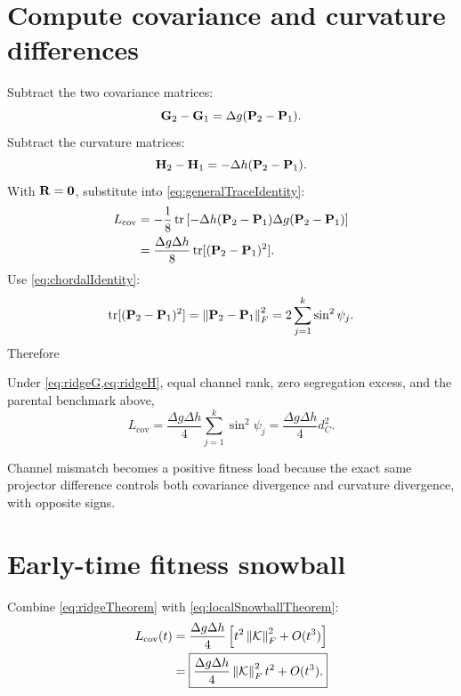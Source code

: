 \section{Compute covariance and curvature differences}

Subtract the two covariance matrices:
\begin{equation}
\mathbf{G}_2-\mathbf{G}_1=\Delta g(\mathbf{P}_2-\mathbf{P}_1).
\end{equation}
Subtract the curvature matrices:
\begin{equation}
\mathbf{H}_2-\mathbf{H}_1=-\Delta h(\mathbf{P}_2-\mathbf{P}_1).
\end{equation}
With \(\mathbf{R}=\mathbf{0}\), substitute into \cref{eq:generalTraceIdentity}:
\begin{align}
L_{\mathrm{cov}}
&=-\frac18\operatorname{tr}\left[
-\Delta h(\mathbf{P}_2-\mathbf{P}_1)
\Delta g(\mathbf{P}_2-\mathbf{P}_1)
\right]\\
&=\frac{\Delta g\Delta h}{8}
\operatorname{tr}[(\mathbf{P}_2-\mathbf{P}_1)^2].
\end{align}
Use \cref{eq:chordalIdentity}:
\begin{equation}
\operatorname{tr}[(\mathbf{P}_2-\mathbf{P}_1)^2]
=\left\lVert \mathbf{P}_2-\mathbf{P}_1\right\rVert_F^2
=2\sum_{j=1}^k\sin^2\psi_j.
\end{equation}
Therefore
\begin{theorem}
Under \cref{eq:ridgeG,eq:ridgeH}, equal channel rank, zero segregation excess, and the parental benchmark above,
\begin{equation}
\boxed{
L_{\mathrm{cov}}
=\frac{\Delta g\Delta h}{4}
\sum_{j=1}^k\sin^2\psi_j
=\frac{\Delta g\Delta h}{4}d_C^2.}
\label{eq:ridgeTheorem}
\end{equation}
\end{theorem}

\inwords Channel mismatch becomes a positive fitness load because the exact same projector difference controls both covariance divergence and curvature divergence, with opposite signs.

\section{Early-time fitness snowball}

Combine \cref{eq:ridgeTheorem} with \cref{eq:localSnowballTheorem}:
\begin{align}
L_{\mathrm{cov}}(t)
&=\frac{\Delta g\Delta h}{4}
\left[t^2\left\lVert \mathcal K\right\rVert_F^2+O(t^3)\right]\\
&=\boxed{
\frac{\Delta g\Delta h}{4}\left\lVert \mathcal K\right\rVert_F^2t^2+O(t^3).}
\label{eq:fitnessSnowballLocal}
\end{align}

